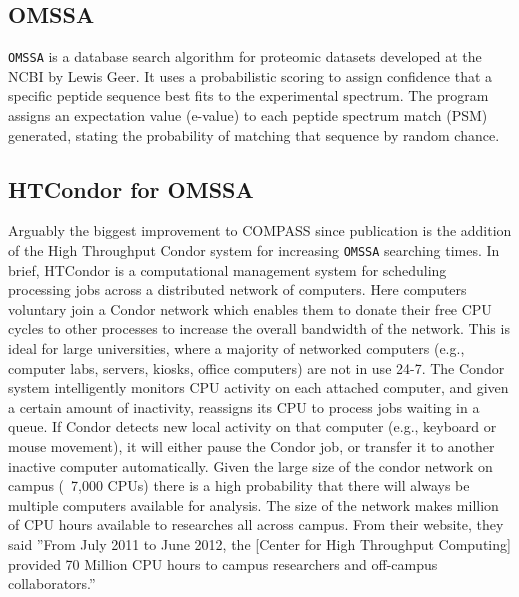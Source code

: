 \subsection*{OMSSA}
\texttt{OMSSA} is a database search algorithm for proteomic datasets developed at the NCBI by Lewis Geer. It uses a probabilistic scoring to assign confidence that a specific peptide sequence best fits to the experimental spectrum. The program assigns an expectation value (e-value) to each peptide spectrum match (PSM) generated, stating the probability of matching that sequence by random chance. 

\subsection*{HTCondor for OMSSA}
Arguably the biggest improvement to COMPASS since publication is the addition of the High Throughput Condor system for increasing \texttt{OMSSA} searching times. In brief, HTCondor is a computational management system for scheduling processing jobs across a distributed network of computers. Here computers voluntary join a Condor network which enables them to donate their free CPU cycles to other processes to increase the overall bandwidth of the network. This is ideal for large universities, where a majority of networked computers (e.g., computer labs, servers, kiosks, office computers) are not in use 24-7. The Condor system intelligently monitors CPU activity on each attached computer, and given a certain amount of inactivity, reassigns its CPU to process jobs waiting in a queue. If Condor detects new local activity on that computer (e.g., keyboard or mouse movement), it will either pause the Condor job, or transfer it to another inactive computer automatically. Given the large size of the condor network on campus (~7,000 CPUs) there is a high probability that there will always be multiple computers available for analysis. The size of the network makes million of CPU hours available to researches all across campus. From their website, they said ''From July 2011 to June 2012, the [Center for High Throughput Computing] provided 70 Million CPU hours to campus researchers and off-campus collaborators.''

